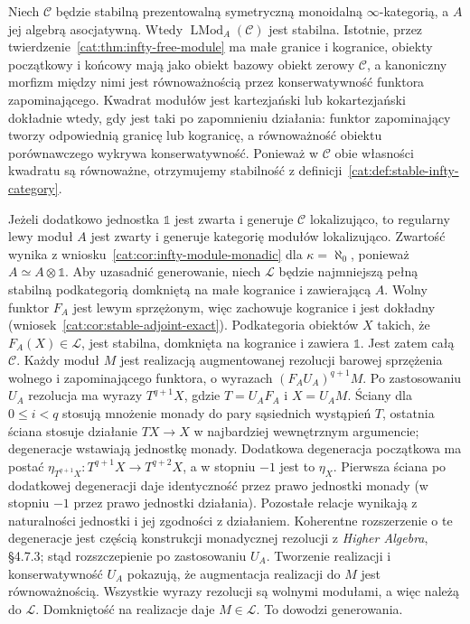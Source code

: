 \begin{przyklad}\label{cat:ex:infty-stable-module-category}
Niech $\mathcal C$ będzie stabilną prezentowalną symetryczną monoidalną $\infty$-kategorią, a $A$ jej algebrą asocjatywną. Wtedy $\operatorname{LMod}_A(\mathcal C)$ jest stabilna. Istotnie, przez twierdzenie~\ref{cat:thm:infty-free-module} ma małe granice i kogranice, obiekty początkowy i końcowy mają jako obiekt bazowy obiekt zerowy $\mathcal C$, a kanoniczny morfizm między nimi jest równoważnością przez konserwatywność funktora zapominającego. Kwadrat modułów jest kartezjański lub kokartezjański dokładnie wtedy, gdy jest taki po zapomnieniu działania: funktor zapominający tworzy odpowiednią granicę lub kogranicę, a równoważność obiektu porównawczego wykrywa konserwatywność. Ponieważ w $\mathcal C$ obie własności kwadratu są równoważne, otrzymujemy stabilność z definicji~\ref{cat:def:stable-infty-category}.

Jeżeli dodatkowo jednostka $\mathbb 1$ jest zwarta i generuje $\mathcal C$ lokalizująco, to regularny lewy moduł $A$ jest zwarty i generuje kategorię modułów lokalizująco. Zwartość wynika z wniosku~\ref{cat:cor:infty-module-monadic} dla $\kappa=\aleph_0$, ponieważ $A\simeq A\otimes\mathbb 1$. Aby uzasadnić generowanie, niech $\mathcal L$ będzie najmniejszą pełną stabilną podkategorią domkniętą na małe kogranice i zawierającą $A$. Wolny funktor $F_A$ jest lewym sprzężonym, więc zachowuje kogranice i jest dokładny (wniosek~\ref{cat:cor:stable-adjoint-exact}). Podkategoria obiektów $X$ takich, że $F_A(X)\in\mathcal L$, jest stabilna, domknięta na kogranice i zawiera $\mathbb 1$. Jest zatem całą $\mathcal C$. Każdy moduł $M$ jest realizacją augmentowanej rezolucji barowej sprzężenia wolnego i zapominającego funktora, o wyrazach $(F_AU_A)^{q+1}M$. Po zastosowaniu $U_A$ rezolucja ma wyrazy $T^{q+1}X$, gdzie $T=U_AF_A$ i $X=U_AM$. Ściany dla $0\leq i<q$ stosują mnożenie monady do pary sąsiednich wystąpień $T$, ostatnia ściana stosuje działanie $TX\to X$ w najbardziej wewnętrznym argumencie; degeneracje wstawiają jednostkę monady. Dodatkowa degeneracja początkowa ma postać $\eta_{T^{q+1}X}:T^{q+1}X\to T^{q+2}X$, a w stopniu $-1$ jest to $\eta_X$. Pierwsza ściana po dodatkowej degeneracji daje identyczność przez prawo jednostki monady (w stopniu $-1$ przez prawo jednostki działania). Pozostałe relacje wynikają z naturalności jednostki i jej zgodności z działaniem. Koherentne rozszerzenie o te degeneracje jest częścią konstrukcji monadycznej rezolucji z \emph{Higher Algebra}, \S4.7.3; stąd rozszczepienie po zastosowaniu $U_A$. Tworzenie realizacji i konserwatywność $U_A$ pokazują, że augmentacja realizacji do $M$ jest równoważnością. Wszystkie wyrazy rezolucji są wolnymi modułami, a więc należą do $\mathcal L$. Domkniętość na realizacje daje $M\in\mathcal L$. To dowodzi generowania.


\end{przyklad}
